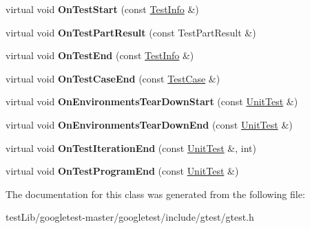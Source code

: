 \begin{DoxyCompactItemize}
\item 
\mbox{\label{classtesting_1_1EmptyTestEventListener_a84fa74cc9ba742f9f847ea405ca84e5e}} 
virtual void {\bfseries On\+Test\+Start} (const \hyperlink{classtesting_1_1TestInfo}{Test\+Info} \&)
\item 
\mbox{\label{classtesting_1_1EmptyTestEventListener_a59e7f7d9f2e2d089a6e8c1e2577f4718}} 
virtual void {\bfseries On\+Test\+Part\+Result} (const Test\+Part\+Result \&)
\item 
\mbox{\label{classtesting_1_1EmptyTestEventListener_afd58d21005f0d0d0399fb114627545d3}} 
virtual void {\bfseries On\+Test\+End} (const \hyperlink{classtesting_1_1TestInfo}{Test\+Info} \&)
\item 
\mbox{\label{classtesting_1_1EmptyTestEventListener_a6bec703158283104c4298f7d8a528515}} 
virtual void {\bfseries On\+Test\+Case\+End} (const \hyperlink{classtesting_1_1TestCase}{Test\+Case} \&)
\item 
\mbox{\label{classtesting_1_1EmptyTestEventListener_a00fa1a4ea5831e20746188414268e7c6}} 
virtual void {\bfseries On\+Environments\+Tear\+Down\+Start} (const \hyperlink{classtesting_1_1UnitTest}{Unit\+Test} \&)
\item 
\mbox{\label{classtesting_1_1EmptyTestEventListener_aea64c83c415b33a4c0b0239bafd1438d}} 
virtual void {\bfseries On\+Environments\+Tear\+Down\+End} (const \hyperlink{classtesting_1_1UnitTest}{Unit\+Test} \&)
\item 
\mbox{\label{classtesting_1_1EmptyTestEventListener_a2253e5a18b3cf7bccd349567a252209d}} 
virtual void {\bfseries On\+Test\+Iteration\+End} (const \hyperlink{classtesting_1_1UnitTest}{Unit\+Test} \&, int)
\item 
\mbox{\label{classtesting_1_1EmptyTestEventListener_a0abcc02bd2331a2e29ad6f4d9daf2a32}} 
virtual void {\bfseries On\+Test\+Program\+End} (const \hyperlink{classtesting_1_1UnitTest}{Unit\+Test} \&)
\end{DoxyCompactItemize}


The documentation for this class was generated from the following file\+:\begin{DoxyCompactItemize}
\item 
test\+Lib/googletest-\/master/googletest/include/gtest/gtest.\+h\end{DoxyCompactItemize}
